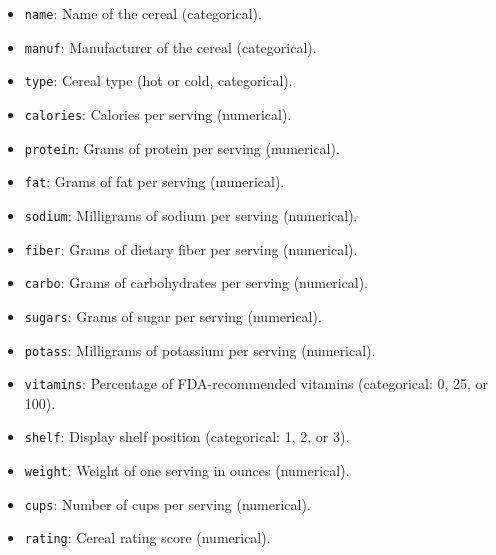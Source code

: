 \documentclass[
]{book}
\newcommand{\passthrough}[1]{#1}
\providecommand{\tightlist}{%
  \setlength{\itemsep}{0pt}\setlength{\parskip}{0pt}}
\theoremstyle{definition}
\theoremstyle{definition}
\theoremstyle{definition}
\theoremstyle{definition}
\theoremstyle{remark}
\begin{document}
\begin{itemize}
\tightlist
\item
  \passthrough{\lstinline!name!}: Name of the cereal (categorical).\\
\item
  \passthrough{\lstinline!manuf!}: Manufacturer of the cereal (categorical).\\
\item
  \passthrough{\lstinline!type!}: Cereal type (hot or cold, categorical).\\
\item
  \passthrough{\lstinline!calories!}: Calories per serving (numerical).\\
\item
  \passthrough{\lstinline!protein!}: Grams of protein per serving (numerical).\\
\item
  \passthrough{\lstinline!fat!}: Grams of fat per serving (numerical).\\
\item
  \passthrough{\lstinline!sodium!}: Milligrams of sodium per serving (numerical).\\
\item
  \passthrough{\lstinline!fiber!}: Grams of dietary fiber per serving (numerical).\\
\item
  \passthrough{\lstinline!carbo!}: Grams of carbohydrates per serving (numerical).\\
\item
  \passthrough{\lstinline!sugars!}: Grams of sugar per serving (numerical).\\
\item
  \passthrough{\lstinline!potass!}: Milligrams of potassium per serving (numerical).\\
\item
  \passthrough{\lstinline!vitamins!}: Percentage of FDA-recommended vitamins (categorical: 0, 25, or 100).\\
\item
  \passthrough{\lstinline!shelf!}: Display shelf position (categorical: 1, 2, or 3).\\
\item
  \passthrough{\lstinline!weight!}: Weight of one serving in ounces (numerical).\\
\item
  \passthrough{\lstinline!cups!}: Number of cups per serving (numerical).\\
\item
  \passthrough{\lstinline!rating!}: Cereal rating score (numerical).
\end{itemize}
\end{document}
